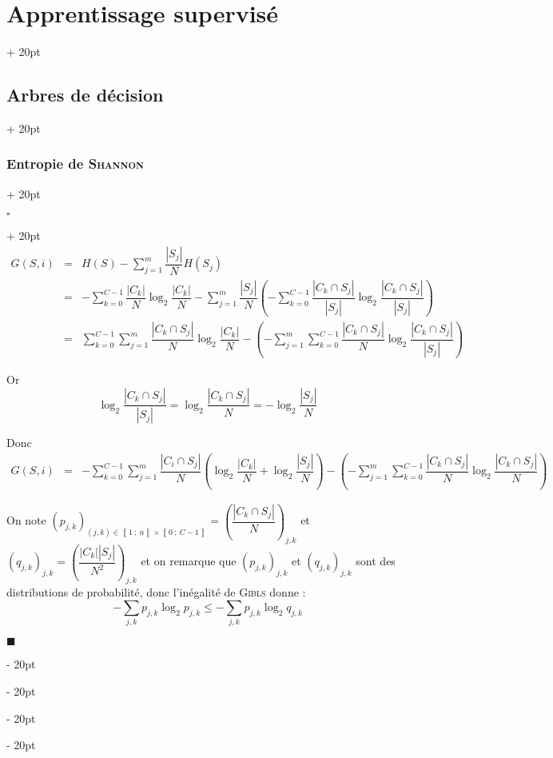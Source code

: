 \documentclass[a4paper, 12pt, twoside]{article}
\newcommand{\nset}[2]{\left\llbracket #1\ ;\ #2 \right\rrbracket}
\newcommand{\lr}[1]{\left( #1 \right)}
\newcommand{\abs}[1]{\left\lvert #1 \right\rvert}
\renewcommand{\le}{\leqslant}
\newcommand{\ind}[1][20pt]{\advance\leftskip + #1}
\newcommand{\deind}[1][20pt]{\advance\leftskip - #1}
\newenvironment{indt}[2][20pt]{#2 \par \ind[#1]}{\par \deind} %
\newenvironment{proof}[1][{}]{\begin{indt}{$\square$ #1}}{$\blacksquare$ \end{indt}}
\begin{document}
\begin{indt}{\section{Apprentissage supervisé}}
\begin{indt}{\subsection{Arbres de décision}}
\begin{indt}{\subsubsection{Entropie de \textsc{Shannon}}}
                \vspace{6pt}
                
                \begin{proof}
                    \[
                        \begin{array}{rcl}
                            G(S, i)
                            &=& \displaystyle
                            H(S) - \sum_{j = 1}^m \dfrac{\abs{S_j}}{N} H(S_j)
                            \\
                            &=& \displaystyle
                            - \sum_{k = 0}^{C - 1} \dfrac{\abs{C_k}}{N} \log_2 \dfrac{\abs{C_k}}{N}
                            - \sum_{j = 1}^m \dfrac{\abs{S_j}}{N} \lr{
                                -\sum_{k = 0}^{C - 1} \dfrac{\abs{C_k \cap S_j}}{\abs{S_j}} \log_2 \dfrac{\abs{C_k \cap S_j}}{\abs{S_j}}
                            }
                            \\
                            &=& \displaystyle
                            \sum_{k = 0}^{C - 1} \sum_{j = 1}^m \dfrac{\abs{C_k \cap S_j}}{N}\log_2 \dfrac{\abs{C_k}}{N}
                            - \lr{
                                -\sum_{j = 1}^m \sum_{k = 0}^{C - 1} \dfrac{\abs{C_k \cap S_j}}{N} \log_2 \dfrac{\abs{C_k \cap S_j}}{\abs{S_j}}
                            }
                        \end{array}
                    \]

                    Or
                    \[
                        \log_2 \dfrac{\abs{C_k \cap S_j}}{\abs{S_j}}
                        = \log_2 \dfrac{\abs{C_k \cap S_j}}{N}
                        = - \log_2 \dfrac{\abs{S_j}}{N}
                    \]

                    Donc
                    \[
                        \begin{array}{rcl}
                            G(S, i)
                            &=&\displaystyle
                            - \sum_{k = 0}^{C - 1} \sum_{j = 1}^m \dfrac{\abs{C_i \cap S_j}}{N} \lr{\log_2 \dfrac{\abs{C_k}}{N} + \log_2 \dfrac{\abs{S_j}}{N}}
                            - \lr{
                                -\sum_{j = 1}^m \sum_{k = 0}^{C - 1} \dfrac{\abs{C_k \cap S_j}}{N} \log_2 \dfrac{\abs{C_k \cap S_j}}{N}
                            }
                        \end{array}
                    \]

                    On note $\displaystyle \lr{p_{j, k}}_{(j, k) \in \nset 1 n \times \nset 0 {C - 1}} = \lr{\dfrac{\abs{C_k \cap S_j}}{N}}_{j, k}$
                    et $\displaystyle \lr{q_{j, k}}_{j, k} = \lr{\dfrac{\abs{C_k} \abs{S_j}}{N^2}}_{j, k}$
                    et on remarque que $\lr{p_{j, k}}_{j, k}$ et $\lr{q_{j, k}}_{j, k}$ sont des distributions de probabilité, donc l'inégalité de \textsc{Gibls} donne :
                    \[
                        - \sum_{j, k} p_{j, k} \log_2 p_{j, k}
                        \le
                        - \sum_{j, k} p_{j, k}\log_2 q_{j, k}
                    \]


\end{proof}
\end{indt}
\end{indt}
\end{indt}
\end{document}
